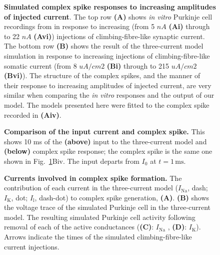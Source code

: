 \documentclass[utf8]{frontiersSCNS} %
\newcommand{\mse}{\,\mathrm{ms}}
\renewcommand{\k}{\mathrm{K}}
\newcommand{\na}{\mathrm{Na}}
\newcommand{\leak}{\mathrm{l}}
\begin{document}
\begin{figure}[!ht]
\caption{\textbf{Simulated complex spike responses to increasing
    amplitudes of injected current}. The top row \textbf{(A)} shows \textsl{in
    vitro} Purkinje cell recordings from \protect\cite{DavieEtAl2008} in response to increasing (from 5 $nA$ \textbf{(Ai)} through to 22 $nA$ \textbf{(Avi)}) injections of climbing-fibre-like synaptic current. The bottom row \textbf{(B)} shows
  the result of the three-current model simulation in response to increasing injections of climbing-fibre-like somatic current (from 8 $uA/cm2$ \textbf{(Bi)} through to 215 $uA/cm2$ \textbf{(Bvi)}). The structure of the complex spikes, and the manner of their response to increasing amplitudes of injected current, are very similar when comparing the \textsl{in vitro} responses and the output of our model. The models presented here were fitted to the complex spike recorded in \textbf{(Aiv)}.}
\label{injection_amplitudes}
\end{figure}

\begin{figure}[!ht]
\caption{\textbf{Comparison of the input current and complex spike.}
  This shows 10 ms of the \textbf{(above)} input to the three-current
  model and \textbf{(below)} complex spike response; the complex spike
  is the same one shown in Fig.~\ref{injection_amplitudes}Biv. The input departs from $I_0$ at $t=1\mse$.}
    \label{fig:S1_fig}
\end{figure}

\begin{figure}[!ht]
\caption{\textbf{Currents involved in complex spike formation.} The
contribution of each current in the three-current model ($I_{\na}$,
dash; $I_{\k}$, dot; $I_{\leak}$, dash-dot) to
complex spike generation, \textbf{(A)}. \textbf{(B)} shows the
 voltage trace of the simulated Purkinje cell in the three-current model. The resulting simulated Purkinje cell activity
following removal of each of the active conductances (\textbf{(C)}: $I_{\na}$
, \textbf{(D)}: $I_{\k}$). Arrows
indicate the times of the simulated climbing-fibre-like current
injections.}
\label{currents}
\end{figure}
\end{document}
